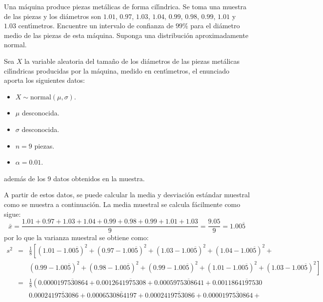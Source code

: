 \begin{enunciado}
 Una m\'aquina produce piezas met\'alicas de forma cil\'{\i}ndrica. Se toma una muestra de las piezas y los di\'ametros son $1.01$, $0.97$, $1.03$, $1.04$, $0.99$, $0.98$, $0.99$, $1.01$ y $1.03$ cent\'{\i}metros. Encuentre un intervalo de confianza de $99\%$ para el di\'ametro medio de las piezas de esta m\'aquina. Suponga una distribuci\'on aproximadamente normal.
\end{enunciado}

\begin{solucion}
 Sea $X$ la variable aleatoria del tama\~no de los di\'ametros de las piezas met\'alicas cil\'{\i}ndricas producidas por la m\'aquina, medido en cent\'{\i}metros, el enunciado aporta los siguientes datos:
 \begin{itemize}
  \item $X\sim\text{normal}(\mu,\sigma)$.
  \item $\mu$ desconocida.
  \item $\sigma$ desconocida.
  \item $n=9$ piezas.
  \item $\alpha=0.01$.
 \end{itemize}
 adem\'as de los $9$ datos obtenidos en la muestra.
 \par
 A partir de estos datos, se puede calcular la media y desviaci\'on est\'andar muestral como se muestra a continuaci\'on. La media muestral se calcula f\'acilmente como sigue:
 \begin{equation*}
  \bar{x} = \frac{1.01 + 0.97 + 1.03 + 1.04 + 0.99 + 0.98 + 0.99 + 1.01 + 1.03}{9} = \frac{9.05}{9} =  1.00\overline{5}
 \end{equation*}
 por lo que la varianza muestral se obtiene como:
 \begin{eqnarray*}  
  s^2 & = & \frac{1}{8} \left[ \left(1.01-1.00\overline{5} \right)^2 + \left(0.97-1.00\overline{5} \right)^2 + \left(1.03-1.00\overline{5} \right)^2 + \left(1.04-1.00\overline{5} \right)^2 + \right. \\
  & & \left. \left(0.99-1.00\overline{5} \right)^2 + \left(0.98-1.00\overline{5} \right)^2 + \left(0.99-1.00\overline{5} \right)^2 + \left(1.01-1.00\overline{5} \right)^2 + \left(1.03-1.00\overline{5} \right)^2 \right] \\
  & = & \frac{1}{8}\left( 0.0000\overline{197530864} + 0.0012\overline{641975308} + 0.0005\overline{975308641} + 0.0011\overline{864197530} \right. \\
  & & \left. 0.0002\overline{419753086} + 0.0006\overline{530864197} + 0.0002\overline{419753086} + 0.0000\overline{197530864} + \right. \\

\end{eqnarray*}
\end{solucion}

